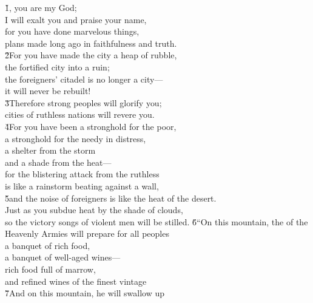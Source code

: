 \begin{poetry}
\poeml {}
\v{1}, you are my God; \\
\poemll    I will exalt you and praise your name, \\
\poeml for you have done marvelous things, \\
\poemlll       plans made long ago in faithfulness and truth. \\
\poeml \v{2}For you have made the city a heap of rubble, \\
\poemll    the fortified city into a ruin; \\
\poeml the foreigners' citadel is no longer a city--- \\
\poemll    it will never be rebuilt! \\
\poeml \v{3}Therefore strong peoples will glorify you; \\
\poemll    cities of ruthless nations will revere you. \\
\poeml \v{4}For you have been a stronghold for the poor, \\
\poemll    a stronghold for the needy in distress, \\
\poeml a shelter from the storm \\
\poemll    and a shade from the heat--- \\
\poeml for the blistering attack from the ruthless \\
\poemll    is like a rainstorm beating against a wall, \\
\poeml \v{5}and the noise of foreigners is like the heat of the desert. \\
\poemll    Just as you subdue heat by the shade of clouds, \\
\poemlll       so the victory songs of violent men will be stilled.
\poeml \v{6}``On this mountain, the  of the Heavenly Armies will prepare for all peoples \\
\poemll    a banquet of rich food, \\
\poeml a banquet of well-aged wines--- \\
\poemll    rich food full of marrow, \\
\poemlll       and refined wines of the finest vintage \\
\poeml \v{7}And on this mountain, he will swallow up \\

\end{poetry}
